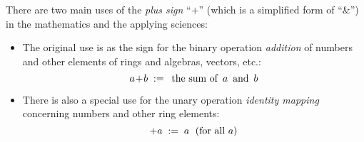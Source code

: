 \documentclass[12pt]{article}
\theoremstyle{definition}
\begin{document}
There are two main uses of the {\em plus sign} ``$+$'' (which is a simplified form of ``\&'') in the mathematics and the applying sciences:
\begin{itemize}
\item The original use is as the sign for the binary operation {\em addition} of numbers and other elements of rings and algebras, vectors, etc.:
$$a\!+\!b\; := \mbox{\, the sum of\, } a \mbox{\, and\, }b$$
\item There is also a special use for the unary operation {\em identity mapping} concerning numbers and other ring elements:
$$+a\; :=\; a \mbox{\; (for all  } a)$$
\end{itemize}
\end{document}
